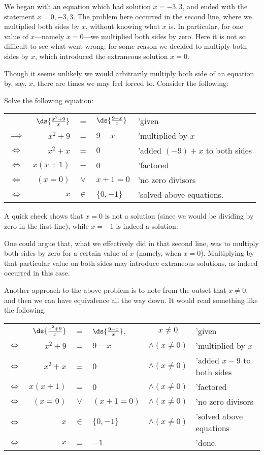 \noindent We began with an equation which had solution $x=-3,3$, and
ended with the statement $x=0,-3,3$.  The problem here occurred in the
second line, where we multiplied both sides by $x$, without knowing
what $x$ is.  In particular, for one value of $x$---namely $x=0$---we
multiplied both sides by zero.  Here it is not so difficult to see 
what went wrong:  for some reason we decided to multiply
both sides by $x$, which introduced the extraneous solution
$x=0$.

Though it seems unlikely we would arbitrarily multiply both side
of an equation by, say, $x$, there are times we may feel forced to.
Consider the following:

\bex  Solve the following equation: 

\begin{tabular}{crcll}
&$\ds{\frac{x^2+9}{x}}$&=&$\ds{\frac{9-x}{x}}$ &'given\\[10pt] 
$\implies$ &$x^2+9$&=&$9-x$&'multiplied by $x$\\
$\iff$ &$x^2+x$&=&$0$&'added $(-9)+x$ to both sides\\
$\iff$ &$x(x+1)$&=&0&'factored\\
$\iff$ &$(x=0)$&$\vee$&$x+1=0$&'no  zero divisors\\
$\iff$ &$x$&$\in$&$\{0,-1\}$&'solved above equations.
\end{tabular} 

\noindent A quick check shows that $x=0$ is not a solution
(since we would be dividing by zero in the first line), while
$x=-1$ is indeed a solution.   
\eex

One could argue that, what we effectively did in that second
line, was to multiply both sides by zero for a certain value
of $x$ (namely, when $x=0$).  Multiplying by that particular
value on both sides may introduce extraneous solutions, as indeed
occurred in this case. 

Another approach to the above problem is to note from the outset that
$x\ne0$, and then we can have equivalence all the way down.
It would read something like the following:

\noindent\begin{tabular}{crclcl}
&$\ds{\frac{x^2+9}{x}}$&=&$\ds{\frac{9-x}{x}}$, &$x\ne0$ &'given\\[10pt]
$\iff$ &$x^2+9$&=&$9-x$ &$\wedge (x\ne0)$&'multiplied by $x$\\
$\iff$ &$x^2+x$&=&$0$ &$\wedge (x\ne0)$&'added $x-9$ to both sides\\
$\iff$ &$x(x+1)$&=&0 &$\wedge (x\ne0)$&'factored\\
$\iff$ &$(x=0)$&$\vee$&$(x+1=0)$ &$\wedge (x\ne0)$&'no zero divisors\\
$\iff$ &$x$&$\in$&$\{0,-1\}$ &$\wedge (x\ne0)$ &'solved above equations\\
$\iff$ &$x$&=&$-1$&&'done. 
\end{tabular}
